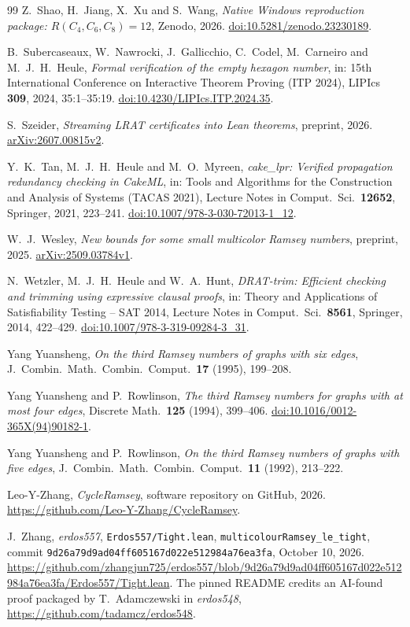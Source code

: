 \documentclass[11pt]{article}
\theoremstyle{definition}
\theoremstyle{remark}
\begin{document}
\begin{thebibliography}{99}
Z.~Shao, H.~Jiang, X.~Xu and S.~Wang, \emph{Native Windows reproduction
package: $R(C_4,C_6,C_8)=12$}, Zenodo, 2026.
\href{https://doi.org/10.5281/zenodo.23230189}{doi:10.5281/zenodo.23230189}.

B.~Subercaseaux, W.~Nawrocki, J.~Gallicchio, C.~Codel, M.~Carneiro and
M.~J.~H.~Heule, \emph{Formal verification of the empty hexagon number},
in: 15th International Conference on Interactive Theorem Proving (ITP
2024), LIPIcs \textbf{309}, 2024, 35:1--35:19.
\href{https://doi.org/10.4230/LIPIcs.ITP.2024.35}{doi:10.4230/LIPIcs.ITP.2024.35}.

S.~Szeider, \emph{Streaming LRAT certificates into Lean theorems},
preprint, 2026. \href{https://arxiv.org/abs/2607.00815v2}{arXiv:2607.00815v2}.

Y.~K.~Tan, M.~J.~H.~Heule and M.~O.~Myreen, \emph{cake\_lpr: Verified
propagation redundancy checking in CakeML}, in: Tools and Algorithms for
the Construction and Analysis of Systems (TACAS 2021), Lecture Notes in
Comput.\ Sci.\ \textbf{12652}, Springer, 2021, 223--241.
\href{https://doi.org/10.1007/978-3-030-72013-1_12}{doi:10.1007/978-3-030-72013-1\_12}.

W.~J.~Wesley, \emph{New bounds for some small multicolor Ramsey numbers},
preprint, 2025. \href{https://arxiv.org/abs/2509.03784v1}{arXiv:2509.03784v1}.

N.~Wetzler, M.~J.~H.~Heule and W.~A.~Hunt, \emph{DRAT-trim: Efficient
checking and trimming using expressive clausal proofs}, in: Theory and
Applications of Satisfiability Testing -- SAT 2014, Lecture Notes in
Comput.\ Sci.\ \textbf{8561}, Springer, 2014, 422--429.
\href{https://doi.org/10.1007/978-3-319-09284-3_31}{doi:10.1007/978-3-319-09284-3\_31}.

Yang Yuansheng, \emph{On the third Ramsey numbers of graphs with six
edges}, J.~Combin.\ Math.\ Combin.\ Comput.\ \textbf{17} (1995), 199--208.

Yang Yuansheng and P.~Rowlinson, \emph{The third Ramsey numbers for graphs
with at most four edges}, Discrete Math.\ \textbf{125} (1994), 399--406.
\href{https://doi.org/10.1016/0012-365X(94)90182-1}{doi:10.1016/0012-365X(94)90182-1}.

Yang Yuansheng and P.~Rowlinson, \emph{On the third Ramsey numbers of
graphs with five edges}, J.~Combin.\ Math.\ Combin.\ Comput.\ \textbf{11}
(1992), 213--222.

Leo-Y-Zhang, \emph{CycleRamsey}, software repository on GitHub, 2026. \url{https://github.com/Leo-Y-Zhang/CycleRamsey}.

J.~Zhang, \emph{erdos557}, \texttt{Erdos557/Tight.lean},
\texttt{multicolourRamsey\_le\_tight}, commit
\texttt{9d26a79d9ad04ff605167d022e512984a76ea3fa}, October 10, 2026.
\url{https://github.com/zhangjun725/erdos557/blob/9d26a79d9ad04ff605167d022e512984a76ea3fa/Erdos557/Tight.lean}.
The pinned README credits an AI-found proof packaged by T.~Adamczewski
in \emph{erdos548}, \url{https://github.com/tadamcz/erdos548}.

\end{thebibliography}
\end{document}
